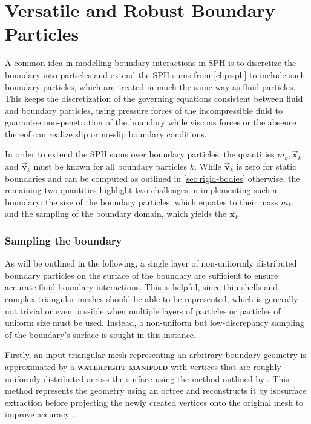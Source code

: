 \documentclass[oneside, a4paper]{book}
\newcommand\emphasis[1]{{\scshape\bfseries#1}}
\newcommand\vek[1]{\vec{\bm{#1}}}
\begin{document}
    \section{Versatile and Robust Boundary Particles}\label{sec:boundary}

    A common idea in modelling boundary interactions in SPH is to discretize the boundary into particles and extend the SPH sums from \autoref{chp:sph} to include such boundary particles, which are treated in much the same way as fluid particles. This keeps the discretization of the governing equations consistent between fluid and boundary particles, using pressure forces of the incompressible fluid to guarantee non-penetration of the boundary while viscous forces or the absence thereof can realize slip or no-slip boundary conditions. 

    In order to extend the SPH sums over boundary particles, the quantities $m_k, \vek{x}_k $ and $ \vek{v}_k$ must be known for all boundary particles $k$. While $\vek{v}_k$ is zero for static boundaries and can be computed as outlined in \autoref{sec:rigid-bodies} otherwise, the remaining two quantities highlight two challenges in implementing such a boundary: the size of the boundary particles, which equates to their mass $m_k$, and the sampling of the boundary domain, which yields the $\vek{x}_k$.

    \subsubsection{Sampling the boundary}\label{subsec:sampling-the-boundary}
    As will be outlined in the following, a single layer of non-uniformly distributed boundary particles on the surface of the boundary are sufficient to ensure accurate fluid-boundary interactions. This is helpful, since thin shells and complex triangular meshes should be able to be represented, which is generally not trivial or even possible when multiple layers of particles or particles of uniform size must be used. Instead, a non-uniform but low-discrepancy sampling of the boundary's surface is sought in this instance.

    Firstly, an input triangular mesh representing an arbitrary boundary geometry is approximated by a \emphasis{watertight manifold} with vertices that are roughly uniformly distributed across the surface using the method outlined by \autocite[Huang et al.]{mesh-watertight-manifold}. This method represents the geometry using an octree and reconstructs it by isosurface extraction before projecting the newly created vertices onto the original mesh to improve accuracy \autocite{mesh-watertight-manifold}.
\end{document}
